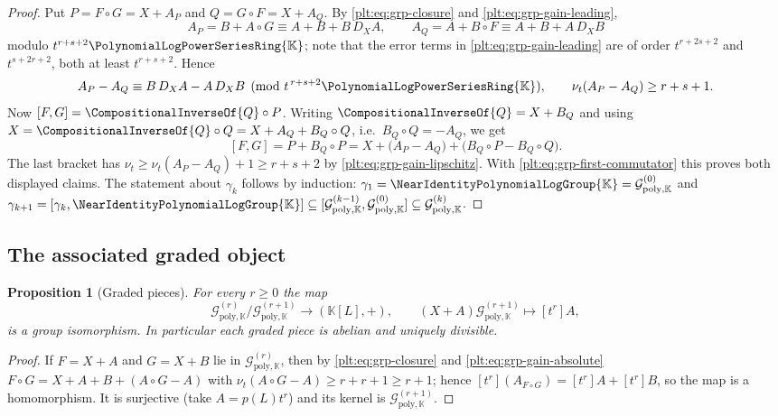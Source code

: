 \documentclass[11pt,oneside]{article}
\theoremstyle{plain}
\newtheorem{proposition}[theorem]{Proposition}
\theoremstyle{definition}
\theoremstyle{remark}
\newcommand{\K}{\mathbb{K}}
\newcommand{\PLpow}{\PolynomialLogPowerSeriesRing{\K}}   %
\newcommand{\Gnear}{\NearIdentityPolynomialLogGroup{\K}} %
\newcommand{\Gfilt}[1]{\mathcal{G}^{(#1)}_{\mathrm{poly},\K}}
\newcommand{\ordt}{\nu_{t}}                              %
\newcommand{\DX}{D_{X}}                                  %
\newcommand{\compose}{\mathbin{\circ}}
\begin{document}
\begin{proof}
Put \(P=F\compose G=X+A_P\) and \(Q=G\compose F=X+A_Q\).  By
\eqref{plt:eq:grp-closure} and \eqref{plt:eq:grp-gain-leading},
\[
  A_P=B+A\compose G\equiv A+B+B\,\DX A,
  \qquad
  A_Q=A+B\compose F\equiv A+B+A\,\DX B
\]
modulo \(t^{r+s+2}\PLpow\); note that the error terms in
\eqref{plt:eq:grp-gain-leading} are of order \(t^{r+2s+2}\) and
\(t^{s+2r+2}\), both at least \(t^{r+s+2}\).  Hence
\begin{equation}\label{plt:eq:grp-first-commutator}
  A_P-A_Q\equiv B\,\DX A-A\,\DX B \pmod{t^{\,r+s+2}\PLpow},
  \qquad
  \ordt(A_P-A_Q)\ge r+s+1 .
\end{equation}
Now \([F,G]=\CompositionalInverseOf{Q}\compose P\).  Writing
\(\CompositionalInverseOf{Q}=X+B_Q\) and using
\(X=\CompositionalInverseOf{Q}\compose Q=X+A_Q+B_Q\compose Q\), i.e.\
\(B_Q\compose Q=-A_Q\), we get
\[
  [F,G]=P+B_Q\compose P
       =X+\bigl(A_P-A_Q\bigr)+\bigl(B_Q\compose P-B_Q\compose Q\bigr).
\]
The last bracket has \(\ordt\ge\ordt(A_P-A_Q)+1\ge r+s+2\) by
\eqref{plt:eq:grp-gain-lipschitz}.  With
\eqref{plt:eq:grp-first-commutator} this proves both displayed claims.
The statement about \(\gamma_k\) follows by induction:
\(\gamma_1=\Gnear=\Gfilt{0}\) and
\(\gamma_{k+1}=[\gamma_k,\Gnear]\subseteq[\Gfilt{k-1},\Gfilt{0}]
 \subseteq\Gfilt{k}\).
\end{proof}


\subsection{The associated graded object}

\begin{proposition}[Graded pieces]\label{plt:prop:grp-graded}
For every \(r\ge0\) the map
\[
  \Gfilt{r}/\Gfilt{r+1}\longrightarrow(\K[L],+),
  \qquad
  (X+A)\Gfilt{r+1}\longmapsto[t^r]A,
\]
is a group isomorphism.  In particular each graded piece is abelian and
uniquely divisible.
\end{proposition}

\begin{proof}
If \(F=X+A\) and \(G=X+B\) lie in \(\Gfilt{r}\), then by
\eqref{plt:eq:grp-closure} and \eqref{plt:eq:grp-gain-absolute}
\(F\compose G=X+A+B+(A\compose G-A)\) with
\(\ordt(A\compose G-A)\ge r+r+1\ge r+1\); hence
\([t^r](A_{F\compose G})=[t^r]A+[t^r]B\), so the map is a homomorphism.  It is
surjective (take \(A=p(L)t^r\)) and its kernel is \(\Gfilt{r+1}\).
\end{proof}
\end{document}
